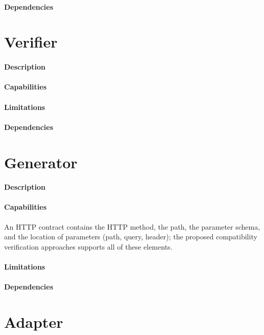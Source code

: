 \paragraph{Dependencies}

\section{Verifier} %
\label{sec:verifier}

\paragraph{Description}
\paragraph{Capabilities}
\paragraph{Limitations}
\paragraph{Dependencies}

\section{Generator} %
\label{sec:generator}

\paragraph{Description}
\paragraph{Capabilities}
An HTTP contract contains the HTTP method, the
path, the parameter schema, and the location of parameters (path, query, header); the
proposed compatibility verification approaches supports all of these elements.

\paragraph{Limitations}
\paragraph{Dependencies}

\section{Adapter} %
\label{sec:adapter}


